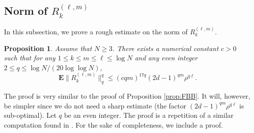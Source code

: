 \documentclass[11pt]{article}
\newtheorem{proposition}[lemma]{Proposition}
\newcommand{\dE}{\mathbf {E}}
\newcommand{\1}{1\!\!{\sf I}}
\begin{document}
\subsection{Norm of $R_k^{(\ell,m)}$}

In this subsection, we prove a rough estimate on the norm of $R_k^{(\ell,m)} $. 

\begin{proposition}\label{prop:FBR}
Assume that $N \geq 3$. There exists a numerical constant $c > 0$ such that for any $1 \leq k \leq  m \leq \ell \leq  \log N$ and any even integer $2 \leq q \leq \log N / (20 \log \log N)$, 
$$
\dE \| R_k^{(\ell,m)} \|_{q}^{q} \leq  (c qm)^{17 q}  (2d-1)^{qm} \rho ^{q \ell}.
$$ 
\end{proposition}

The proof is very similar to the proof of Proposition \ref{prop:FBB}. It will, however, be simpler since we do not need a sharp estimate (the factor $(2d -1)^{qm} \rho^{q\ell}$ is sub-optimal). Let $q$ be an even integer. The proof is a repetition of a similar computation found in \cite{MR4203039,MR4024563}. For the sake of completeness, we include a proof.
\end{document}
